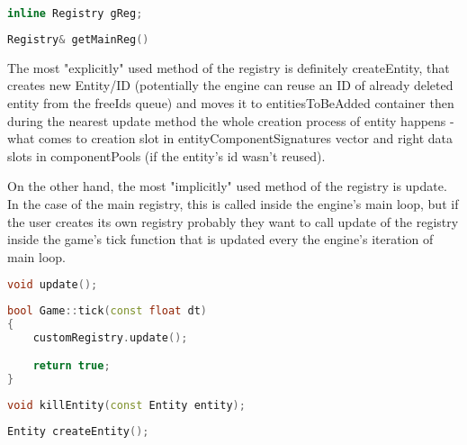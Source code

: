 \begin{lstlisting}[language=c++, caption=Private method of access to the main registry (./tsengine/engine/src/globals.hpp)]
inline Registry gReg;
\end{lstlisting}

\begin{lstlisting}[language=c++, caption=Public method of access to the main registry (./tsengine/engine/src/globals.hpp)]
Registry& getMainReg()
\end{lstlisting}

The most "explicitly" used method of the registry is definitely createEntity, that creates new Entity/ID (potentially the engine can reuse an ID of already deleted entity from the freeIds queue) and moves it to entitiesToBeAdded container then during the nearest update method the whole creation process of entity happens - what comes to creation slot in entityComponentSignatures vector and right data slots in componentPools (if the entity's id wasn't reused).

On the other hand, the most "implicitly" used method of the registry is update. In the case of the main registry, this is called inside the engine's main loop, but if the user creates its own registry probably they want to call update of the registry inside the game's tick function that is updated every the engine's iteration of main loop.
\begin{lstlisting}[language=c++, caption=ECS Registry's update method (./engine/include/tsengine/ecs/ecs.h)]
    void update();
\end{lstlisting}

\begin{lstlisting}[language=c++, caption=An example of how custom registry should be updated]
bool Game::tick(const float dt)
{
    customRegistry.update();

    return true;
}
\end{lstlisting}

\begin{lstlisting}[language=c++, caption=Public method of access to the main registry (./tsengine/engine/src/globals.hpp)]
void killEntity(const Entity entity);
\end{lstlisting}

\begin{lstlisting}[language=c++, caption=Creation of the new Entity (./engine/include/tsengine/ecs/ecs.h)]
Entity createEntity();
\end{lstlisting}

